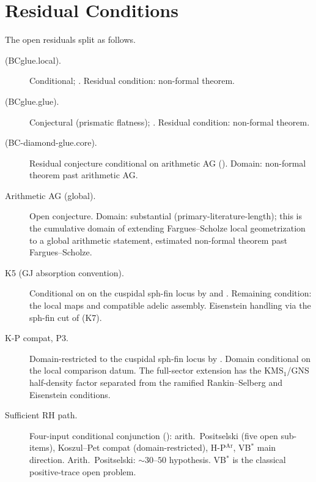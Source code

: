 \section{Residual Conditions}
\label{v4-arith:bcglue-k5:residual}

The open residuals split as follows.

\begin{description}
\item[(BCglue.local).] Conditional;
.
Residual condition: non-formal theorem.
\item[(BCglue.glue).] Conjectural (prismatic flatness);
.
Residual condition: non-formal theorem.
\item[(BC-diamond-glue.core).] Residual conjecture conditional on
arithmetic AG (). Domain:
non-formal theorem past arithmetic AG.
\item[Arithmetic AG (global).] Open conjecture. Domain: substantial
(primary-literature-length); this is
the cumulative domain of extending Fargues--Scholze local
geometrization to a global arithmetic statement, estimated
non-formal theorem past Fargues--Scholze.
\item[K5 (GJ absorption convention).] Conditional on
 on the cuspidal
sph-fin locus by
 and
. Remaining condition:
the local maps and compatible adelic assembly. Eisenstein handling via the
sph-fin cut of (K7).
\item[K-P compat, P3.] Domain-restricted to the cuspidal sph-fin
locus by . Domain
conditional on the local comparison datum. The full-sector extension
has the KMS\(_{1}\)/GNS half-density factor separated from the
ramified Rankin--Selberg and Eisenstein conditions.
\item[Sufficient RH path.] Four-input conditional conjunction
(): arith.~Positselski
(five open sub-items), Koszul--Pet compat (domain-restricted),
H-P\(^{\mathrm{Ar}}\), VB\(^{*}\) main direction.
Arith.~Positselski: \(\sim 30\)--\(50\) hypothesis.
VB\(^{*}\) is the classical positive-trace open problem.
\end{description}

